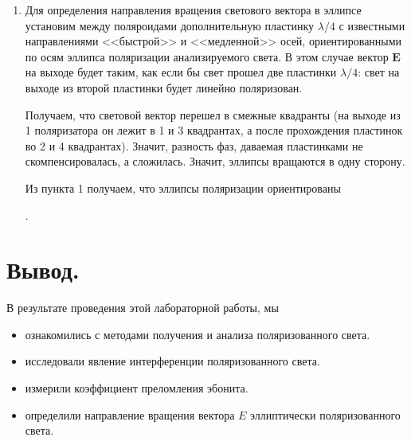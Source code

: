 \documentclass[a4paper, 12pt, twoside]{article}
\begin{document}
\begin{enumerate}
	\item Для определения направления вращения светового вектора в эллипсе установим между поляроидами дополнительную пластинку $\lambda /4$ с известными направлениями <<быстрой>> и <<медленной>> осей, ориентированными по осям эллипса поляризации анализируемого света. В этом случае вектор $\mathbf{E}$ на выходе будет таким, как если бы свет прошел две пластинки $\lambda /4$: свет на выходе из второй пластинки будет линейно поляризован. 
	
	Получаем, что световой вектор перешел в смежные квадранты (на выходе из 1 поляризатора он лежит в 1 и 3 квадрантах, а после прохождения пластинок во 2 и 4 квадрантах). Значит, разность фаз, даваемая пластинками не скомпенсировалась, а сложилась. Значит, эллипсы вращаются в одну сторону.
	
	Из пункта 1 получаем, что эллипсы поляризации ориентированы \begin{center}
	.	
	\end{center}
\end{enumerate}

\section{Вывод.}
В результате проведения этой лабораторной работы, мы 
\begin{itemize}
	\item ознакомились с методами получения и анализа поляризованного света.
	
	\item исследовали явление интерференции поляризованного света.
	
	\item измерили коэффициент преломления эбонита.
	
	\item определили направление вращения вектора $E$ эллиптически поляризованного света.
\end{itemize}
\end{document}
